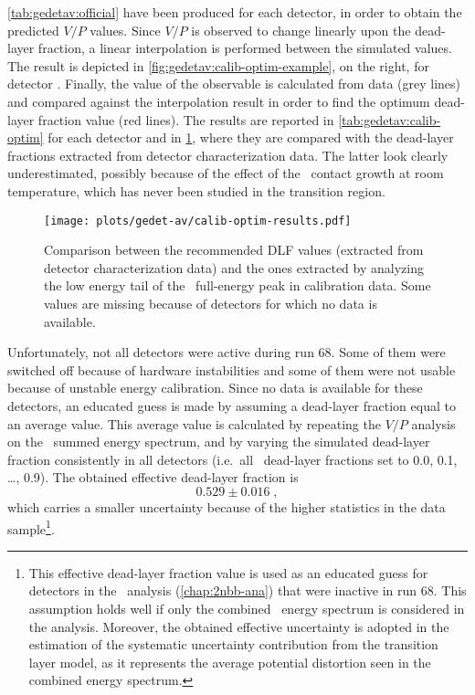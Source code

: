 \cref{tab:gedetav:official} have been produced for each detector, in order to obtain the
predicted $V/P$ values. Since $V/P$ is observed to change linearly upon the dead-layer
fraction, a linear interpolation is performed between the simulated values. The result is
depicted in \cref{fig:gedetav:calib-optim-example}, on the right, for detector .
Finally, the value of the observable is calculated from data (grey lines) and compared
against the interpolation result in order to find the optimum dead-layer fraction value
(red lines). The results are reported in \cref{tab:gedetav:calib-optim} for each
detector and in \cref{fig:gedetav:calib-optim}, where they are compared with the
dead-layer fractions extracted from detector characterization data. The latter look
clearly underestimated, possibly because of the effect of the \nplus\ contact growth at
room temperature, which has never been studied in the transition region.
\begin{table}
  \centering
  \caption{%
    \bege\ dead-layer fractions obtained from special \Th\ calibration data (run 68).
    Detector  does not fully deplete~\cite{Agostini2019} and is excluded from the
    analysis. Detectors marked with an asterisk ($^*$) are switched off or unusable in run
    68.
  }\label{tab:gedetav:calib-optim}
  
\end{table}
\begin{figure}
  \centering
  \texttt{[image: plots/gedet-av/calib-optim-results.pdf]}
  \caption{%
    Comparison between the recommended DLF values (extracted from detector
    characterization data) and the ones extracted by analyzing the low energy tail of the
    \Tl\ full-energy peak in calibration data. Some values are missing because of
    detectors for which no data is available.
  }\label{fig:gedetav:calib-optim}
\end{figure}
\newpar
Unfortunately, not all detectors were active during run 68. Some of them were switched off
because of hardware instabilities and some of them were not usable because of unstable
energy calibration. Since no data is available for these detectors, an educated guess is
made by assuming a dead-layer fraction equal to an average value. This average value is
calculated by repeating the $V/P$ analysis on the \bege\ summed energy spectrum, and by
varying the simulated dead-layer fraction consistently in all detectors (i.e.~all \bege\
dead-layer fractions set to 0.0, 0.1, \ldots, 0.9). The obtained effective dead-layer
fraction is
\[
  0.529 \pm 0.016 \;,
\]
which carries a smaller uncertainty because of the higher statistics in the data
sample\footnote{%
  This effective dead-layer fraction value is used as an educated guess for detectors in
  the \nnbb\ analysis (\cref{chap:2nbb-ana}) that were inactive in run 68. This assumption
  holds well if only the combined \bege\ energy spectrum is considered in the analysis.
  Moreover, the obtained effective uncertainty is adopted in the estimation of the systematic
  uncertainty contribution from the transition layer model, as it represents the average
  potential distortion seen in the combined energy spectrum.
}.

